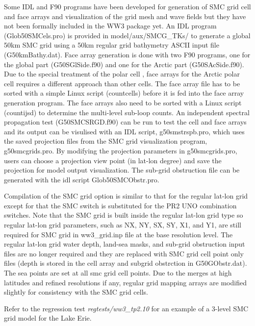 Some IDL and F90 programs have been developed for generation of SMC grid cell
and face arrays and visualization of the grid mesh and wave fields but they
have not been formally included in the WW3 package yet. An IDL program 
(Glob50SMCels.pro) is provided in model/aux/SMCG\_TKs/ to generate a global 50km 
SMC grid using a 50km regular grid bathymetry ASCII input file (G50kmBathy.dat). 
Face array generation is done with two F90 programs, one for the global part 
(G50SGlSide.f90) and one for the Arctic part (G50SAcSide.f90).  Due to the special 
treatment of the polar cell \citep{art:Li12}, face arrays for the Arctic polar cell 
requires a different approach than other cells. The face array file has to be 
sorted with a simple Linux script (countcells) before it is fed into the face array 
generation program.  The face arrays also need to be sorted with a Linux script 
(countijsd) to determine the multi-level sub-loop counts.  An independent spectral 
propagation test (G50SMCSRGD.f90) can be run to test the cell and face arrays and 
its output can be visulised with an IDL script, g50smstrspb.pro, which uses the 
saved projection files from the SMC grid visualization program, g50smcgrids.pro. 
By modifying the projection parameters in g50smcgrids.pro, users can choose a 
projection view point (in lat-lon degree) and save the projection for model 
output visualization.  The sub-grid obstruction file can be generated with the 
idl script Glob50SMCObstr.pro.

Compilation of the SMC grid option is similar to that for the regular
lat-lon grid except for that the SMC switch is substituted for the
PR2 UNO combination switches. Note that the SMC grid is built inside
the regular lat-lon grid type so regular lat-lon grid parameters,
such as NX, NY, SX, SY, X1, and Y1, are still required for SMC grid
in ww3\_grid.inp file at the base resolution level. The regular lat-lon
grid water depth, land-sea masks, and sub-grid obstruction input files
are no longer required and they are replaced with SMC grid cell point only 
files (depth is stored in the cell array and subgrid obstrction in 
G50GObstr.dat).  The sea points are set at all smc grid cell points. 
Due to the merges at high latitudes and refined resolutions if any,
regular grid mapping arrays are modified slightly for consistency
with the SMC grid cells. 

Refer to the regression test \emph{regtests/ww3\_tp2.10}
for an example of a 3-level SMC grid model for the Lake Erie.

